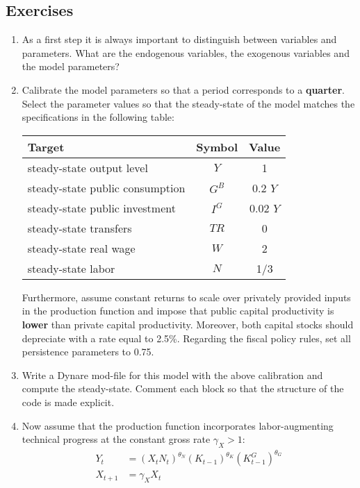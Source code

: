 \subsection*{Exercises}

\begin{enumerate}

\item
As a first step it is always important to distinguish between variables and parameters.
What are the endogenous variables, the exogenous variables and the model parameters?  

\item
Calibrate the model parameters so that a period corresponds to a \textbf{quarter}.
Select the parameter values so that the steady-state of the model matches the specifications in the following table:
\begin{center}
\begin{tabular}{lcc}
Target & Symbol & Value \\
\toprule
steady-state output level       & \(Y\)    & 1 \\
steady-state public consumption & \(G^B\)  & 0.2 \(Y\) \\
steady-state public investment  & \(I^G\)  & 0.02 \(Y\) \\
steady-state transfers          & \({TR}\) & 0 \\
steady-state real wage          & \(W\)    & 2\\
steady-state labor              & \(N\)    & 1/3\\
\bottomrule
\end{tabular}
\end{center}
Furthermore, assume constant returns to scale over privately provided inputs in the production function
  and impose that public capital productivity is \textbf{lower} than private capital productivity.
Moreover, both capital stocks should depreciate with a rate equal to 2.5\%.
Regarding the fiscal policy rules, set all persistence parameters to 0.75.

\item
Write a Dynare mod-file for this model with the above calibration and compute the steady-state.
Comment each block so that the structure of the code is made explicit.

\newpage

\item
Now assume that the production function incorporates
  labor-augmenting technical progress at the constant gross rate \(\gamma_X>1\):
\begin{align}
Y_t &= {(X_t N_t)}^{\theta_N} {(K_{t-1})}^{\theta_K} {(K_{t-1}^G)}^{\theta_G} \label{eq:BaxterKing:ProductionFunctionGrowth}
\\
X_{t+1} &= \gamma_X X_t \nonumber
\end{align}


\end{enumerate}
